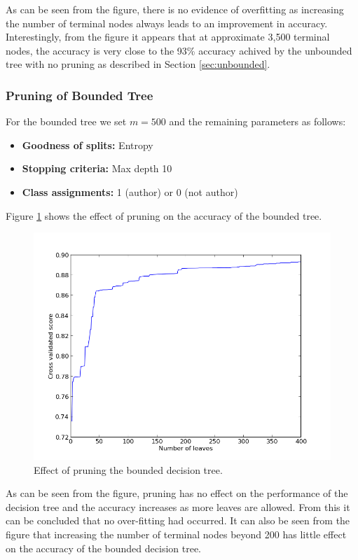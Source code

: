 \documentclass[letterpaper,12pt]{article}
\begin{document}
As can be seen from the figure, there is no evidence of overfitting as increasing the number of terminal nodes always leads to an improvement in accuracy. Interestingly, from the figure it appears that at approximate 3,500 terminal nodes, the accuracy is very close to the 93\% accuracy achived by the unbounded tree with no pruning as described in Section \ref{sec:unbounded}.

\subsubsection{Pruning of Bounded Tree}
For the bounded tree we set $m=500$ and the remaining parameters as follows:

\begin{itemize}
\item\textbf{Goodness of splits:} Entropy
\item\textbf{Stopping criteria:} Max depth 10
\item\textbf{Class assignments:} 1 (author) or 0 (not author)
\end{itemize}

Figure \ref{fig:prune_10} shows the effect of pruning on the accuracy of the bounded tree.

\begin{figure}[ht!]
\includegraphics[width=\textwidth]{prune-depth10.png}
\caption{Effect of pruning the bounded decision tree.}\label{fig:prune_10}
\end{figure}

As can be seen from the figure, pruning has no effect on the performance of the decision tree and the accuracy increases as more leaves are allowed. From this it can be concluded that no over-fitting had occurred. It can also be seen from the figure that increasing the number of terminal nodes beyond 200 has little effect on the accuracy of the bounded decision tree.
\end{document}
